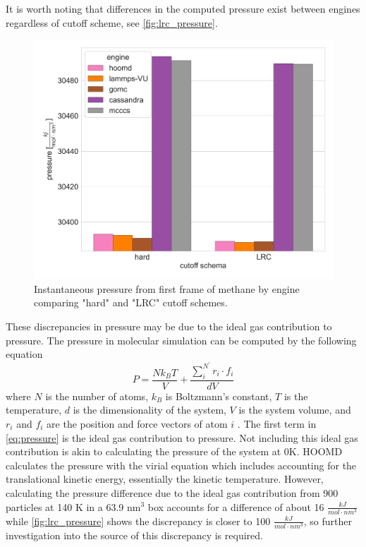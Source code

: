 It is worth noting that differences in the computed pressure exist between engines regardless of cutoff scheme, see \autoref{fig:lrc_pressure}.
\begin{figure}[h!]
    \centering
    \includegraphics[width=0.8\linewidth,keepaspectratio]{figures/rep_study/lrc_pressure.png}
    \caption{Instantaneous pressure from first frame of methane by engine comparing "hard" and "LRC" cutoff schemes.}\label{fig:lrc_pressure}
\end{figure}
These discrepancies in pressure may be due to the ideal gas contribution to pressure. 
The pressure in molecular simulation can be computed by the following equation
\begin{equation}\label{eq:pressure}
    P = \frac{N k_{B} T}{V} + \frac{\sum_{i}^{N^{'}} r_{i} \cdot f_{i}}{dV}
\end{equation}
where $N$ is the number of atoms, $k_{B}$ is Boltzmann's constant, $T$ is the temperature, $d$ is the dimensionality of the system, $V$ is the system volume, and $r_i$ and $f_i$ are the position and force vectors of atom $i$ \citep{Thompson2009}.
The first term in \autoref{eq:pressure} is the ideal gas contribution to pressure.
Not including this ideal gas contribution is akin to calculating the pressure of the system at 0K.
HOOMD calculates the pressure with the virial equation which includes accounting for the translational kinetic energy, essentially the kinetic temperature.
However, calculating the pressure difference due to the ideal gas contribution from 900 particles at 140 K in a 63.9 nm$^3$ box accounts for a difference of about 16 $\frac{kJ}{mol \cdot nm^{3}}$ while \autoref{fig:lrc_pressure} shows the discrepancy is closer to 100 $\frac{kJ}{mol \cdot nm^{3}}$, so further investigation into the source of this discrepancy is required.

